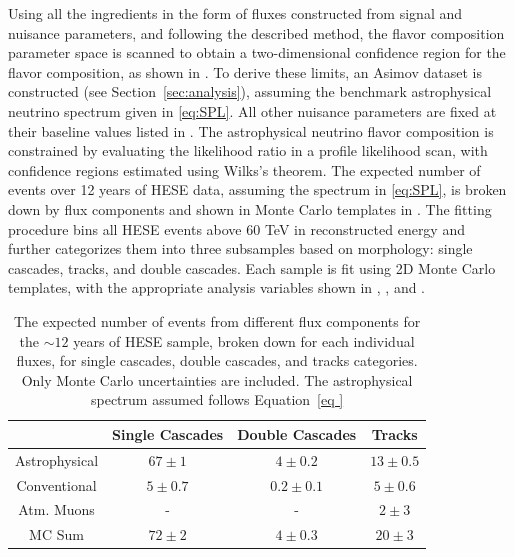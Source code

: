 Using all the ingredients in the form of fluxes constructed from signal and nuisance parameters, and following the described method, the flavor composition parameter space is scanned to obtain a two-dimensional confidence region for the flavor composition, as shown in . To derive these limits, an Asimov dataset is constructed (see Section~\ref{sec:analysis}), assuming the benchmark astrophysical neutrino spectrum given in \ref{eq:SPL}. All other nuisance parameters are fixed at their baseline values listed in . The astrophysical neutrino flavor composition is constrained by evaluating the likelihood ratio in a profile likelihood scan, with confidence regions estimated using Wilks’s theorem. The expected number of events over 12 years of HESE data, assuming the spectrum in \ref{eq:SPL}, is broken down by flux components and shown in Monte Carlo templates in . The fitting procedure bins all HESE events above 60 TeV in reconstructed energy and further categorizes them into three subsamples based on morphology: single cascades, tracks, and double cascades. Each sample is fit using 2D Monte Carlo templates, with the appropriate analysis variables shown in , , and .

\begin{table}[h]
    \caption{The expected number of events from different flux components for the $\sim12$ years of HESE sample,  broken down for each individual fluxes, for single cascades, double cascades, and tracks categories. Only Monte Carlo uncertainties are included. The astrophysical spectrum assumed follows Equation~\ref{eq
    }}
    
    \begin{tabular}{ c |c|c|c}
        
        \hline
        &Single Cascades &Double Cascades&Tracks\\
        \hline
        \hline
        Astrophysical&$67\pm1$& $4\pm0.2$ & $13\pm0.5$\\
        Conventional & $5\pm0.7$& $0.2\pm0.1$ &$5\pm0.6$\\
        Atm. Muons & - & - & $2\pm3$\\
        \hline
        MC Sum & $72\pm2$ & $4\pm0.3$ & $20\pm3$\\
        \hline
    \end{tabular}
\end{table}


